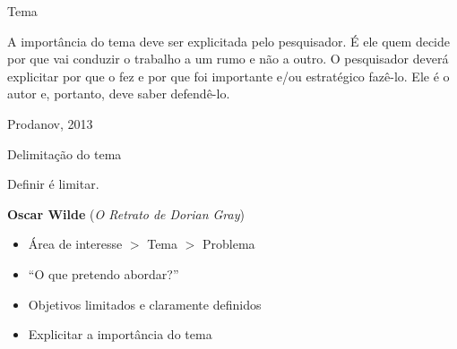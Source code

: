 \documentclass{beamer}
\begin{document}
\begin{frame}{Tema}
  \begin{block}{}
    \footnotesize
    A importância do tema deve ser explicitada pelo pesquisador. É ele
    quem decide por que vai conduzir o trabalho a um rumo e não a
    outro. O pesquisador deverá explicitar por que o fez e por que foi
    importante e/ou estratégico fazê-lo. Ele é o autor e, portanto,
    deve saber defendê-lo.
  \end{block}

  \vfill
  \scriptsize
  \hfill Prodanov, 2013
\end{frame}

\begin{frame}{Delimitação do tema}
  \begin{block}{}
    Definir é limitar.

    \bigskip
    \scriptsize
    \hfill {\bf Oscar Wilde} ({\em O Retrato de Dorian Gray})
  \end{block}
  \bigskip
  \begin{itemize}
    \footnotesize
  \item Área de interesse $>$ Tema $>$ Problema
  \item ``O que pretendo abordar?''
  \item Objetivos limitados e claramente definidos
  \item Explicitar a importância do tema
  \end{itemize}
\end{frame}



\end{document}
